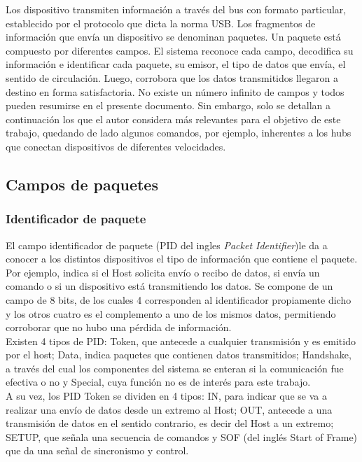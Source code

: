 Los dispositivo transmiten información a través del bus con formato particular, establecido por el protocolo que dicta la norma USB. Los fragmentos de información que envía un dispositivo se denominan paquetes. Un paquete está compuesto por diferentes campos. El sistema reconoce cada campo, decodifica su información e identificar cada paquete, su emisor, el tipo de datos que envía, el sentido de circulación. Luego, corrobora que los datos transmitidos llegaron a destino en forma satisfactoria. No existe un número infinito de campos y todos pueden resumirse en el presente documento. Sin embargo, solo se detallan a continuación los que el autor considera más relevantes para el objetivo de este trabajo, quedando de lado algunos comandos, por ejemplo, inherentes a los hubs que conectan dispositivos de diferentes velocidades.

\subsection{Campos de paquetes}

	\subsubsection*{Identificador de paquete}
		El campo identificador de paquete (PID del ingles {\it Packet Identifier})le da a conocer a los distintos dispositivos el tipo de información que contiene el paquete. Por ejemplo, indica si el Host solicita envío o recibo de datos, si envía un comando o si un dispositivo está transmitiendo los datos. Se compone de un campo de 8 bits, de los cuales 4 corresponden al identificador propiamente dicho y los otros cuatro es el complemento a uno de los mismos datos, permitiendo corroborar que no hubo una pérdida de información.\\
		
		Existen 4 tipos de PID: Token, que antecede a cualquier transmisión y es emitido por el host; Data, indica paquetes que contienen datos transmitidos; Handshake, a través del cual los componentes del sistema se enteran si la comunicación fue efectiva o no y Special, cuya función no es de interés para este trabajo.\\
	
		A su vez, los PID Token se dividen en 4 tipos: IN, para indicar que se va a realizar una envío de datos desde un extremo al Host; OUT, antecede a una transmisión de datos en el sentido contrario, es decir del Host a un extremo; SETUP, que señala una secuencia de comandos y SOF (del inglés {Start of Frame)} que da una señal de sincronismo y control.\\
	
